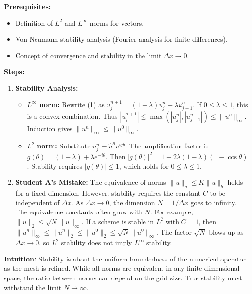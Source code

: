 \begin{solution}
\textbf{Prerequisites:}
\begin{itemize}
    \item Definition of $L^2$ and $L^\infty$ norms for vectors.
    \item Von Neumann stability analysis (Fourier analysis for finite differences).
    \item Concept of convergence and stability in the limit $\Delta x \to 0$.
\end{itemize}

\textbf{Steps:}
\begin{enumerate}
    \item \textbf{Stability Analysis:}
    \begin{itemize}
        \item \textbf{$L^\infty$ norm:} Rewrite (1) as $u_j^{n+1} = (1-\lambda) u_j^n + \lambda u_{j-1}^n$. If $0 \le \lambda \le 1$, this is a convex combination. Thus $|u_j^{n+1}| \le \max(|u_j^n|, |u_{j-1}^n|) \le \|u^n\|_\infty$. Induction gives $\|u^n\|_\infty \le \|u^0\|_\infty$.
        \item \textbf{$L^2$ norm:} Substitute $u_j^n = \hat{u}^n e^{ij\theta}$. The amplification factor is $g(\theta) = (1-\lambda) + \lambda e^{-i\theta}$. Then $|g(\theta)|^2 = 1 - 2\lambda(1-\lambda)(1-\cos\theta)$. Stability requires $|g(\theta)| \le 1$, which holds for $0 \le \lambda \le 1$.
    \end{itemize}

    \item \textbf{Student A's Mistake:} The equivalence of norms $\|u\|_a \le K \|u\|_b$ holds for a fixed dimension. However, stability requires the constant $C$ to be independent of $\Delta x$. As $\Delta x \to 0$, the dimension $N = 1/\Delta x$ goes to infinity. The equivalence constants often grow with $N$. For example, $\|u\|_2 \le \sqrt{N} \|u\|_\infty$. If a scheme is stable in $L^2$ with $C=1$, then $\|u^n\|_\infty \le \|u^n\|_2 \le \|u^0\|_2 \le \sqrt{N} \|u^0\|_\infty$. The factor $\sqrt{N}$ blows up as $\Delta x \to 0$, so $L^2$ stability does not imply $L^\infty$ stability.
\end{enumerate}

\textbf{Intuition:}
Stability is about the uniform boundedness of the numerical operator as the mesh is refined. While all norms are equivalent in any finite-dimensional space, the ratio between norms can depend on the grid size. True stability must withstand the limit $N \to \infty$.
\end{solution}

